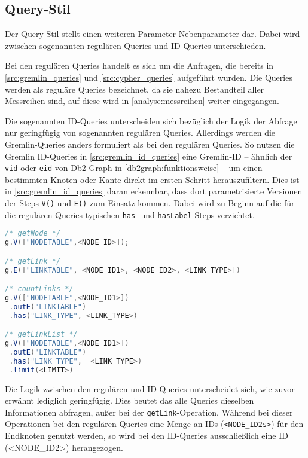 \subsection{Query-Stil}
Der Query-Stil stellt einen weiteren Parameter Nebenparameter dar. Dabei wird zwischen sogenannten regulären Queries und ID-Queries unterschieden. 

Bei den regulären Queries handelt es sich um die Anfragen, die bereits in \autoref{src:gremlin_queries} und \autoref{src:cypher_queries} aufgeführt wurden. Die Queries werden als reguläre Queries bezeichnet, da sie nahezu Bestandteil aller Messreihen sind, auf diese wird in \autoref{analyse:messreihen} weiter eingegangen. 

Die sogenannten ID-Queries unterscheiden sich bezüglich der Logik der Abfrage nur geringfügig von sogenannten regulären Queries. Allerdings werden die Gremlin-Queries anders formuliert als bei den regulären Queries. So nutzen die Gremlin ID-Queries in \autoref{src:gremlin_id_queries} eine Gremlin-ID -- ähnlich der \texttt{vid} oder \texttt{eid} von Db2 Graph in \autoref{db2graph:funktionsweise} -- um einen bestimmten Knoten oder Kante direkt im ersten Schritt herauszufiltern. Dies ist in \autoref{src:gremlin_id_queries} daran erkennbar, dass dort parametrisierte Versionen der Steps \texttt{V()} und \texttt{E()} zum Einsatz kommen. Dabei wird zu Beginn auf die für die regulären Queries typischen \texttt{has}- und \texttt{hasLabel}-Steps verzichtet.

\begin{lstlisting}[label=src:gremlin_id_queries,caption={Gremlin ID-Queries},language=Java]
/* getNode */
g.V(["NODETABLE",<NODE_ID>]);

/* getLink */
g.E(["LINKTABLE", <NODE_ID1>, <NODE_ID2>, <LINK_TYPE>])

/* countLinks */
g.V(["NODETABLE",<NODE_ID1>])
 .outE("LINKTABLE")
 .has("LINK_TYPE", <LINK_TYPE>)

/* getLinkList */
g.V(["NODETABLE",<NODE_ID1>])
 .outE("LINKTABLE")
 .has("LINK_TYPE",  <LINK_TYPE>)
 .limit(<LIMIT>)
\end{lstlisting}

Die Logik zwischen den regulären und ID-Queries unterscheidet sich, wie zuvor erwähnt lediglich geringfügig. Dies beutet das alle Queries dieselben Informationen abfragen, außer bei der \texttt{getLink}-Operation. Während bei dieser Operationen bei den regulären Queries eine Menge an IDs (\texttt{<NODE\_ID2s>}) für den Endknoten genutzt werden, so wird bei den ID-Queries ausschließlich eine ID (<NODE\_ID2>) herangezogen. 

